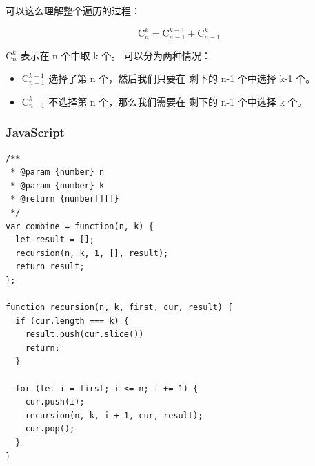 可以这么理解整个遍历的过程：

\begin{displaymath}
  \mathrm{C}_n^k = \mathrm{C}_{n-1}^{k-1} + \mathrm{C}_{n-1}^k
\end{displaymath}

$\mathrm{C}_n^k$ 表示在 n 个中取 k 个。
可以分为两种情况：

\begin{itemize}
  \item $\mathrm{C}_{n-1}^{k-1}$ 选择了第 n 个，然后我们只要在
    剩下的 n-1 个中选择 k-1 个。
  \item $\mathrm{C}_{n-1}^k$ 不选择第 n 个，那么我们需要在
    剩下的 n-1 个中选择 k 个。
\end{itemize}

\subsubsection{JavaScript}

\begin{verbatim}
/**
 * @param {number} n
 * @param {number} k
 * @return {number[][]}
 */
var combine = function(n, k) {
  let result = [];
  recursion(n, k, 1, [], result);
  return result;
};

function recursion(n, k, first, cur, result) {
  if (cur.length === k) {
    result.push(cur.slice())
    return;
  }

  for (let i = first; i <= n; i += 1) {
    cur.push(i);
    recursion(n, k, i + 1, cur, result);
    cur.pop();
  }
}
\end{verbatim}
